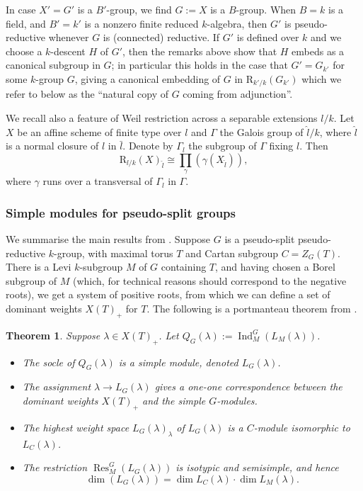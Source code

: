 \documentclass[11pt,reqno]{amsart}
\newtheorem{theorem}[lemma]{Theorem}
\theoremstyle{definition}
\theoremstyle{remark}
\theoremstyle{definition}
\theoremstyle{plain}
\DeclareMathOperator{\Res}{Res}
\DeclareMathOperator{\Ind}{Ind}
\newcommand{\R}{\mathrm{R}}
\begin{document}
In case $X'=G'$ is a $B'$-group, we find $G:=X$ is a $B$-group. 
When $B=k$ is a field, and $B'=k'$ is a nonzero finite reduced $k$-algebra, then $G'$ is pseudo-reductive whenever $G$ is (connected) reductive.  
If $G'$ is defined over $k$ and we choose a $k$-descent $H$ of $G'$, then the remarks above show that $H$ embeds as a canonical subgroup in $G$; in particular this holds in the case that $G' = G_{k'}$ for some $k$-group $G$, giving a canonical embedding of $G$ in $\R_{k'/k}(G_{k'})$ 
which we refer to below as the ``natural copy of $G$ coming from adjunction''.

We recall also a feature of Weil restriction across a separable extensions $l/k$. Let $X$ be an affine scheme of finite type over $l$ and $\Gamma$ the Galois group of $\hat l/k$, where $\hat l$ is a normal closure of $l$ in $\bar l$. Denote by $\Gamma_l$ the subgroup of $\Gamma$ fixing $l$. Then \begin{equation}\label{eqn:weilsep}\R_{l/k}(X)_{\hat l}\cong \prod_{\gamma}(\gamma(X_{\hat l})),\end{equation} where $\gamma$ runs over a transversal of $\Gamma_l$ in $\Gamma$.




\subsubsection{Simple modules for pseudo-split groups}\label{sec:BS}
We summarise the main results from \cite{BS22}.
Suppose $G$ is a pseudo-split pseudo-reductive $k$-group, with maximal torus $T$ and Cartan subgroup $C = Z_G(T)$. 
There is a Levi $k$-subgroup $M$ of $G$ containing $T$, and having chosen a Borel subgroup of $M$ (which, for technical reasons should correspond to the negative roots), we get a system of positive roots, from which we can define a set of dominant weights $X(T)_+$ for $T$.
The following is a portmanteau theorem from \cite[Thm.~1.2, Thm.~3.1]{BS22}.

\begin{theorem}\label{thm:fromBS}
Suppose $\lambda\in X(T)_+$. Let $Q_G(\lambda):= \Ind_M^G(L_M(\lambda))$.
\begin{itemize}
\item[(i)] The socle of $Q_G(\lambda)$ is a simple module, denoted $L_G(\lambda)$.
\item[(ii)] The assignment $\lambda \to L_G(\lambda)$ gives a one-one correspondence between the dominant weights $X(T)_+$ and the simple $G$-modules.
\item[(iii)] The highest weight space $L_G(\lambda)_\lambda$ of $L_G(\lambda)$ is a $C$-module isomorphic to $L_C(\lambda)$.
\item[(iv)] The restriction $\Res^G_M(L_G(\lambda))$ is isotypic and semisimple, and hence 
$$
\dim(L_G(\lambda)) = \dim L_C(\lambda)\cdot \dim L_M(\lambda).\label{thm:fromBS:dim}
$$
\end{itemize}
\end{theorem}
\end{document}
